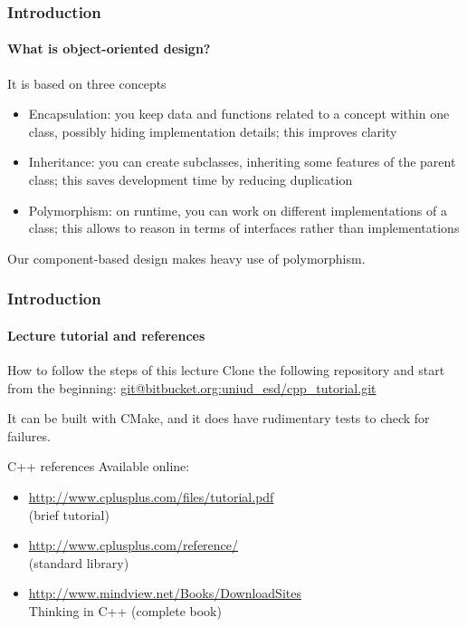 \begin{frame}
\frametitle{Introduction}
\framesubtitle{What is object-oriented design?}

\begin{block}{It is based on three concepts}
\begin{itemize}
\item Encapsulation: you keep data and functions related to a concept within one class, possibly hiding implementation details; this improves clarity
\item Inheritance: you can create subclasses, inheriting some features of the parent class; this saves development time by reducing duplication
\item Polymorphism: on runtime, you can work on different implementations of a class; this allows to reason in terms of interfaces rather than implementations
\end{itemize}
Our component-based design makes heavy use of polymorphism.
\end{block}

\end{frame}

\begin{frame}
\frametitle{Introduction}
\framesubtitle{Lecture tutorial and references}

\begin{block}{How to follow the steps of this lecture}
Clone the following repository and start from the beginning:
\url{git@bitbucket.org:uniud_esd/cpp_tutorial.git}

\medskip 
\pause
It can be built with CMake, and it does have rudimentary tests to check for failures.
\end{block}
\pause
\begin{block}{C++ references}
Available online:
\begin{itemize}
\item \url{http://www.cplusplus.com/files/tutorial.pdf} \\ (brief tutorial)
\item \url{http://www.cplusplus.com/reference/} \\ (standard library)
\item \url{http://www.mindview.net/Books/DownloadSites} \\ Thinking in C++ (complete book)
\end{itemize}
\end{block}

\end{frame}


